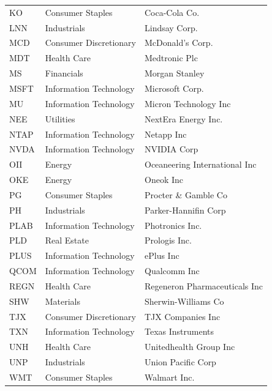 \documentclass[11pt]{article}
\begin{document}
\begin{table}[H]
\begin{tabular}{lll}
KO    & Consumer Staples        & Coca-Cola Co. \\
LNN   & Industrials             & Lindsay Corp. \\
MCD   & Consumer Discretionary  & McDonald's Corp. \\
MDT   & Health Care             & Medtronic Plc \\
MS    & Financials              & Morgan Stanley \\
MSFT  & Information Technology  & Microsoft Corp. \\
MU    & Information Technology  & Micron Technology Inc \\
NEE   & Utilities               & NextEra Energy Inc. \\
NTAP  & Information Technology  & Netapp Inc \\
NVDA  & Information Technology  & NVIDIA Corp \\
OII   & Energy                  & Oceaneering International Inc \\
OKE   & Energy                  & Oneok Inc \\
PG    & Consumer Staples        & Procter \& Gamble Co \\
PH    & Industrials             & Parker-Hannifin Corp \\
PLAB  & Information Technology  & Photronics Inc. \\
PLD   & Real Estate             & Prologis Inc. \\
PLUS  & Information Technology  & ePlus Inc \\
QCOM  & Information Technology  & Qualcomm Inc \\
REGN  & Health Care             & Regeneron Pharmaceuticals Inc \\
SHW   & Materials               & Sherwin-Williams Co \\
TJX   & Consumer Discretionary  & TJX Companies Inc \\
TXN   & Information Technology  & Texas Instruments \\
UNH   & Health Care             & Unitedhealth Group Inc \\
UNP   & Industrials             & Union Pacific Corp \\
WMT   & Consumer Staples        & Walmart Inc. \\
\bottomrule
\end{tabular}
\end{table}
\end{document}
